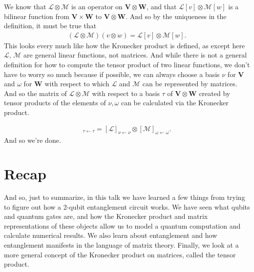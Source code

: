 \documentclass[a4paper,11pt]{article}
\numberwithin{equation}{section}
\theoremstyle{definition}
\newcommand{\lag}{\mathcal{L}}
\newcommand{\M}{\mathcal{M}}
\newcommand{\V}{\mathbf{V}}
\newcommand{\W}{\mathbf{W}}
\begin{document}
We know that $\lag \otimes \M$ is an operator on $\V\otimes \W$, and that $\lag[v]\otimes \M[w]$ is a bilinear function from $\V\times \W$ to $\V\otimes \W$. And so by the uniqueness in the definition, it must be true that
\begin{align*}
(\lag\otimes \M)(v\otimes w) = \lag[v]\otimes \M[w].
\end{align*} 
This looks every much like how the Kronecker product is defined, as except here $\lag$, $\M$ are general linear functions, not matrices. And while there is not a general definition for how to compute the tensor product of two linear functions, we don't have to worry so much because if possible, we can always choose a basis $\nu$ for $\V$ and $\omega$ for $\W$ with respect to which $\lag$ and $\M$ can be represented by matrices. And so the matrix of $\lag\otimes \M$ with respect to a basis $\tau$ of $\V\otimes \W$ created by tensor products of the elements of $\nu, \omega$ can be calculated via the Kronecker product. 

\begin{align*}
[\lag\otimes \M]_{\tau\leftarrow \tau} = [\lag]_{\nu\leftarrow\nu} \otimes [\M]_{\omega\leftarrow\omega}.
\end{align*}
And so we're done.

\section{Recap}
And so, just to summarize, in this talk we have learned a few things from trying to figure out how a 2-qubit entanglement circuit works. We have seen what qubits and quantum gates are, and how the Kronecker product and matrix representations of these objects allow us to model a quantum computation and calculate numerical results. We also learn about entanglement and how entanglement manifests in the language of matrix theory. Finally, we look at a more general concept of the Kronecker product on matrices, called the tensor product. 
\end{document}
